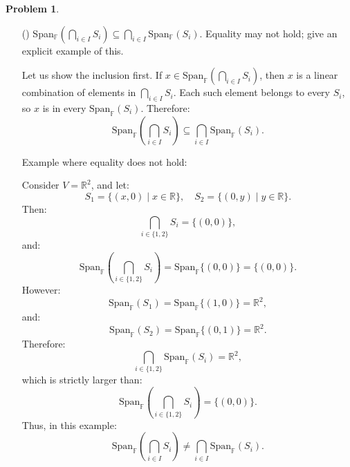 \documentclass[12pt]{article}
\theoremstyle{definition}
\newtheorem{problem}{Problem}
\newcounter{subq}[problem]
\newenvironment{subproblem}
{\refstepcounter{subq} \begin{itemize} \item[(\alph{subq})]}
{\end{itemize} \medskip}
\begin{document}
\begin{problem}
    \begin{subproblem}
        Span$_{\mathbb{F}}\displaystyle(\bigcap_{i \in I}S_i) \subseteq \displaystyle\bigcap_{i\in I}$Span$_{\mathbb{F}}(S_i)$. Equality may not hold; give an explicit example of this.

        \begin{solution}
            Let us show the inclusion first. If \( x \in \text{Span}_{\mathbb{F}} \left( \bigcap_{i \in I} S_i \right) \), then \( x \) is a linear combination of elements in \( \bigcap_{i \in I} S_i \). Each such element belongs to every \( S_i \), so \( x \) is in every \( \text{Span}_{\mathbb{F}}(S_i) \). Therefore:
            \[
            \text{Span}_{\mathbb{F}} \left( \bigcap_{i \in I} S_i \right) \subseteq \bigcap_{i \in I} \text{Span}_{\mathbb{F}}(S_i).
            \]

            Example where equality does not hold:

            Consider \( V = \mathbb{R}^2 \), and let:
            \[
            S_1 = \{ (x, 0) \mid x \in \mathbb{R} \}, \quad S_2 = \{ (0, y) \mid y \in \mathbb{R} \}.
            \]
            Then:
            \[
            \bigcap_{i \in \{1,2\}} S_i = \{ (0, 0) \},
            \]
            and:
            \[
            \text{Span}_{\mathbb{F}} \left( \bigcap_{i \in \{1,2\}} S_i \right) = \text{Span}_{\mathbb{F}} \{ (0,0) \} = \{ (0, 0) \}.
            \]
            However:
            \[
            \text{Span}_{\mathbb{F}}(S_1) = \text{Span}_{\mathbb{F}} \{ (1,0) \} = \mathbb{R}^2,
            \]
            and:
            \[
            \text{Span}_{\mathbb{F}}(S_2) = \text{Span}_{\mathbb{F}} \{ (0,1) \} = \mathbb{R}^2.
            \]
            Therefore:
            \[
            \bigcap_{i \in \{1,2\}} \text{Span}_{\mathbb{F}}(S_i) = \mathbb{R}^2,
            \]
            which is strictly larger than:
            \[
            \text{Span}_{\mathbb{F}} \left( \bigcap_{i \in \{1,2\}} S_i \right) = \{ (0,0) \}.
            \]
            Thus, in this example:
            \[
            \text{Span}_{\mathbb{F}} \left( \bigcap_{i \in I} S_i \right) \neq \bigcap_{i \in I} \text{Span}_{\mathbb{F}}(S_i).
            \]
        \end{solution}
    \end{subproblem}

\end{problem}
\end{document}
